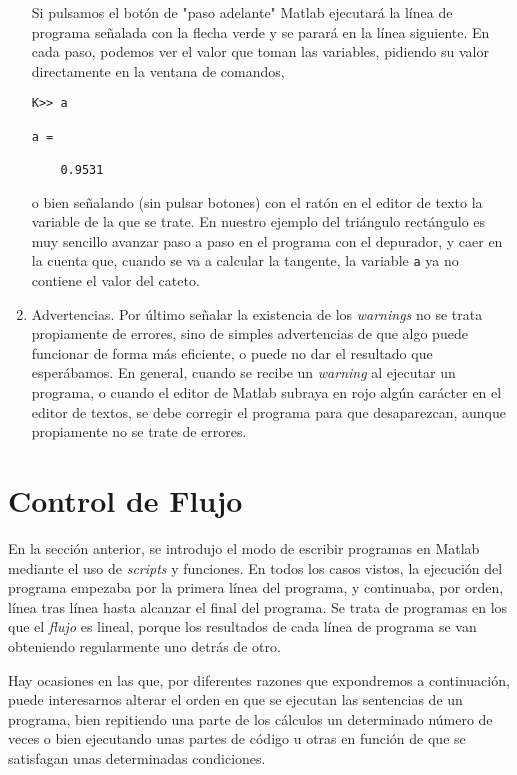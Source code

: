 \begin{enumerate}
Si pulsamos el botón de "paso adelante" Matlab ejecutará la línea de programa señalada con la flecha verde y se parará en la línea siguiente. En cada paso, podemos ver el valor que toman las variables, pidiendo su valor directamente en la ventana de comandos,

\begin{verbatim}
K>> a

a =

    0.9531
\end{verbatim}

o bien señalando (sin pulsar botones) con el ratón en el editor de texto la variable de la que se trate.
En nuestro ejemplo del triángulo rectángulo es muy sencillo avanzar paso a paso en el programa con el depurador, y caer en la cuenta que, cuando se va a calcular la tangente, la variable \texttt{a} ya no contiene el valor del cateto.

\item Advertencias.  Por último señalar la existencia de los \emph{warnings} no se trata propiamente de errores, sino de simples advertencias de que algo puede funcionar de forma más eficiente, o puede no dar el resultado que esperábamos. En general, cuando se recibe un \emph{warning} al ejecutar un programa, o cuando el editor de Matlab subraya en rojo algún carácter en el editor de textos, se debe corregir el programa para que desaparezcan, aunque propiamente no se trate de errores.
\end{enumerate} 


 




\section{Control de Flujo} 
En la sección anterior, se introdujo el modo de escribir programas en Matlab mediante el uso de 	\emph{scripts} y funciones. En todos los casos vistos, la ejecución del programa empezaba por la primera línea del programa, y continuaba, por orden, línea tras línea hasta alcanzar el final del programa. Se trata de programas en los que el \emph{flujo} es lineal, porque los resultados de cada línea de programa se van obteniendo regularmente uno detrás de otro. 

Hay ocasiones en las que, por diferentes razones que expondremos a continuación, puede interesarnos alterar el orden en que se ejecutan las sentencias de un programa, bien repitiendo una parte de los cálculos un determinado número de veces o bien ejecutando unas partes de código u otras en función de que se satisfagan unas determinadas condiciones.

